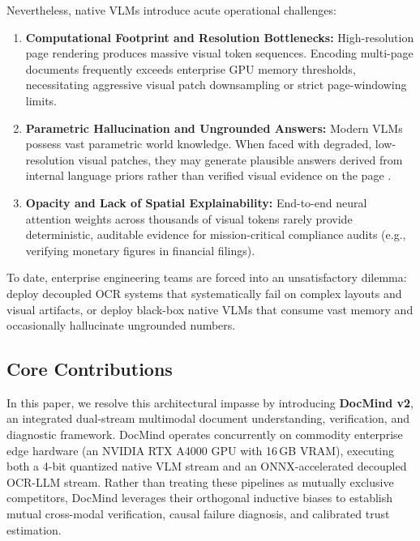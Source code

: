 \documentclass[conference]{IEEEtran}
\begin{document}
Nevertheless, native VLMs introduce acute operational challenges:
\begin{enumerate}
    \item \textbf{Computational Footprint and Resolution Bottlenecks:} High-resolution page rendering produces massive visual token sequences. Encoding multi-page documents frequently exceeds enterprise GPU memory thresholds, necessitating aggressive visual patch downsampling or strict page-windowing limits.
    \item \textbf{Parametric Hallucination and Ungrounded Answers:} Modern VLMs possess vast parametric world knowledge. When faced with degraded, low-resolution visual patches, they may generate plausible answers derived from internal language priors rather than verified visual evidence on the page \cite{b13}.
    \item \textbf{Opacity and Lack of Spatial Explainability:} End-to-end neural attention weights across thousands of visual tokens rarely provide deterministic, auditable evidence for mission-critical compliance audits (e.g., verifying monetary figures in financial filings).
\end{enumerate}

To date, enterprise engineering teams are forced into an unsatisfactory dilemma: deploy decoupled OCR systems that systematically fail on complex layouts and visual artifacts, or deploy black-box native VLMs that consume vast memory and occasionally hallucinate ungrounded numbers.

\subsection{Core Contributions}
In this paper, we resolve this architectural impasse by introducing \textbf{DocMind v2}, an integrated dual-stream multimodal document understanding, verification, and diagnostic framework. DocMind operates concurrently on commodity enterprise edge hardware (an NVIDIA RTX A4000 GPU with 16\,GB VRAM), executing both a 4-bit quantized native VLM stream and an ONNX-accelerated decoupled OCR-LLM stream. Rather than treating these pipelines as mutually exclusive competitors, DocMind leverages their orthogonal inductive biases to establish mutual cross-modal verification, causal failure diagnosis, and calibrated trust estimation.
\end{document}
